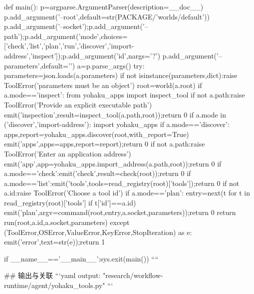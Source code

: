 def main():
    p=argparse.ArgumentParser(description=__doc__)
    p.add_argument('--root',default=str(PACKAGE/'worlds/default'))
    p.add_argument('--socket');p.add_argument('--path');p.add_argument('mode',choices=['check','list','plan','run','discover','import-address','inspect']);p.add_argument('id',nargs='?')
    p.add_argument('--parameters',default='{}')
    a=p.parse_args()
    try:
        parameters=json.loads(a.parameters)
        if not isinstance(parameters,dict):raise ToolError('parameters must be an object')
        root=world(a.root)
        if a.mode=='inspect':
            from yohaku_apps import inspect_tool
            if not a.path:raise ToolError('Provide an explicit executable path')
            emit('inspection',result=inspect_tool(a.path,root));return 0
        if a.mode in ('discover','import-address'):
            import yohaku_apps
            if a.mode=='discover':
                apps,report=yohaku_apps.discover(root,with_report=True)
                emit('apps',apps=apps,report=report);return 0
            if not a.path:raise ToolError('Enter an application address')
            emit('app',app=yohaku_apps.import_address(a.path,root));return 0
        if a.mode=='check':emit('check',result=check(root));return 0
        if a.mode=='list':emit('tools',tools=read_registry(root)['tools']);return 0
        if not a.id:raise ToolError('Choose a tool id')
        if a.mode=='plan':
            entry=next(t for t in read_registry(root)['tools'] if t['id']==a.id)
            emit('plan',argv=command(root,entry,a.socket,parameters));return 0
        return run(root,a.id,a.socket,parameters)
    except (ToolError,OSError,ValueError,KeyError,StopIteration) as e:
        emit('error',text=str(e));return 1

if __name__=='__main__':sys.exit(main())
````

## 输出与关联
```yaml
output: "research/workflow-runtime/agent/yohaku_tools.py"
```
